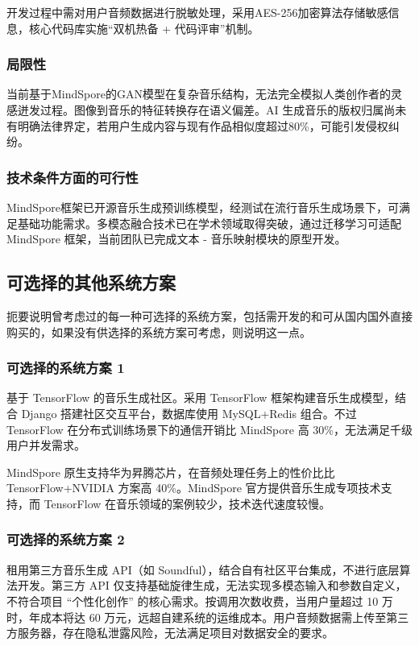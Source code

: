 \documentclass{base}
\begin{document}
开发过程中需对用户音频数据进行脱敏处理，采用AES-256加密算法存储敏感信息，核心代码库实施“双机热备 + 代码评审”机制。

\subsubsection{局限性}

当前基于MindSpore的GAN模型在复杂音乐结构，无法完全模拟人类创作者的灵感迸发过程。图像到音乐的特征转换存在语义偏差。AI 生成音乐的版权归属尚未有明确法律界定，若用户生成内容与现有作品相似度超过80\%，可能引发侵权纠纷。

\subsubsection{技术条件方面的可行性}

MindSpore框架已开源音乐生成预训练模型，经测试在流行音乐生成场景下，可满足基础功能需求。多模态融合技术已在学术领域取得突破，通过迁移学习可适配 MindSpore 框架，当前团队已完成文本 - 音乐映射模块的原型开发。

\subsection{可选择的其他系统方案}

扼要说明曾考虑过的每一种可选择的系统方案，包括需开发的和可从国内国外直接购买的，如果没有供选择的系统方案可考虑，则说明这一点。

\subsubsection{可选择的系统方案 1}

基于 TensorFlow 的音乐生成社区。采用 TensorFlow 框架构建音乐生成模型，结合 Django 搭建社区交互平台，数据库使用 MySQL+Redis 组合。不过 TensorFlow 在分布式训练场景下的通信开销比 MindSpore 高 30\%，无法满足千级用户并发需求。

MindSpore 原生支持华为昇腾芯片，在音频处理任务上的性价比比 TensorFlow+NVIDIA 方案高 40\%。MindSpore 官方提供音乐生成专项技术支持，而 TensorFlow 在音乐领域的案例较少，技术迭代速度较慢。

\subsubsection{可选择的系统方案 2}

租用第三方音乐生成 API（如 Soundful），结合自有社区平台集成，不进行底层算法开发。第三方 API 仅支持基础旋律生成，无法实现多模态输入和参数自定义，不符合项目 “个性化创作” 的核心需求。按调用次数收费，当用户量超过 10 万时，年成本将达 60 万元，远超自建系统的运维成本。用户音频数据需上传至第三方服务器，存在隐私泄露风险，无法满足项目对数据安全的要求。
\end{document}
